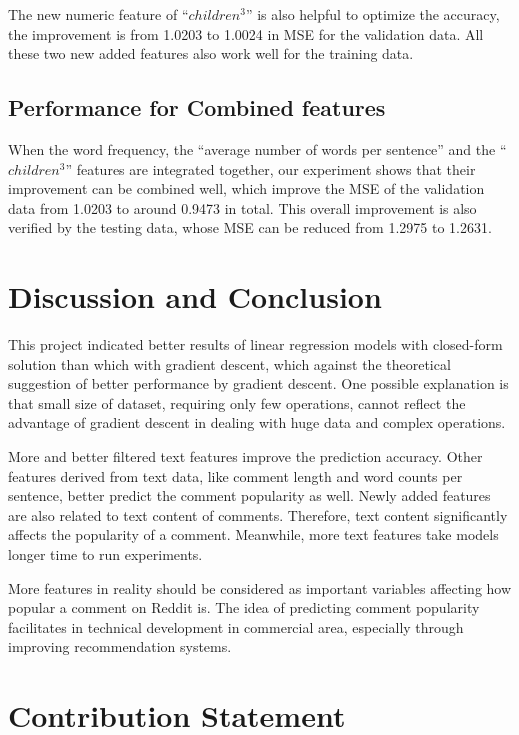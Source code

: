 \documentclass[letterpaper, 11pt]{article}
\begin{document}
The new numeric feature of ``$children^3$'' is also helpful to optimize the accuracy, the improvement is from 1.0203 to 1.0024 in MSE for the validation data. All these two new added features also work well for the training data.

\subsection*{Performance for Combined features}

When the word frequency, the ``average number of words per sentence'' and the ``$children^3$'' features are integrated together, our experiment shows that their improvement can be combined well, which improve the MSE of the validation data from 1.0203 to around 0.9473 in total. This overall improvement is also verified by the testing data, whose MSE can be reduced from 1.2975 to 1.2631.

\section*{Discussion and Conclusion}

This project indicated better results of linear regression models with closed-form solution than which with gradient descent, which against the theoretical suggestion of better performance by gradient descent. One possible explanation is that small size of dataset, requiring only few operations, cannot reflect the advantage of gradient descent in dealing with huge data and complex operations.

More and better filtered text features improve the prediction accuracy. Other features derived from text data, like comment length and word counts per sentence, better predict the comment popularity as well. Newly added features are also related to text content of comments. Therefore, text content significantly affects the popularity of a comment. Meanwhile, more text features take models longer time to run experiments.

More features in reality should be considered as important variables affecting how popular a comment on Reddit is. The idea of predicting comment popularity facilitates in technical development in commercial area, especially through improving recommendation systems.

\section*{Contribution Statement}
\end{document}

